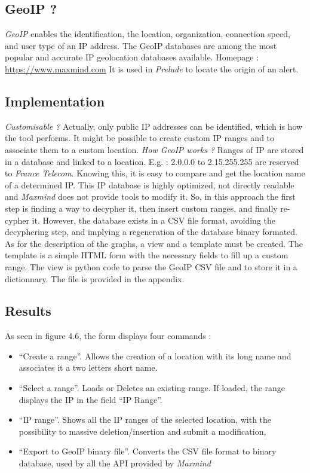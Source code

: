 \documentclass{koala-en}
\begin{document}
\subsection{GeoIP ?}
\emph{GeoIP} enables the identification, the location, organization, connection speed, and user type of an IP address. The GeoIP databases are among the most popular and accurate IP geolocation databases available.
\newline
\newline
Homepage : \url{https://www.maxmind.com}
\newline
\newline
It is used in \emph{Prelude} to locate the origin of an alert.

\subsection{Implementation}
\emph{Customisable ?}
Actually, only public IP addresses can be identified, which is how the tool performs. It might be possible to create custom IP ranges and to associate them to a custom location.
\newline
\newline
\emph{How GeoIP works ?} Ranges of IP are stored in a database and linked to a location. E.g. : 2.0.0.0 to 2.15.255.255 are reserved to \emph{France Telecom}. Knowing this, it is easy to compare and get the location name of a determined IP. This IP database is highly optimized, not directly readable and \emph{Maxmind} does not provide tools to modify it. So, in this approach the first step is finding a way to decypher it, then insert custom ranges, and finally re-cypher it. However, the database exists in a CSV file format, avoiding the decyphering step, and implying a regeneration of the database binary formated.
\newline
\newline
As for the description of the graphs, a view and a template must be created. The template is a simple HTML form with the necessary fields to fill up a custom range. The view is python code to parse the GeoIP CSV file and to store it in a dictionnary. The file is provided in the appendix.

\subsection{Results}
As seen in figure 4.6, the form displays four commands :
\begin{itemize}
  \item ``Create a range''. Allows the creation of a location with its long name and associates it a two letters short name.
  \item ``Select a range''. Loads or Deletes an existing range. If loaded, the range displays the IP in the field ``IP Range''.
  \item ``IP range''. Shows all the IP ranges of the selected location, with the possibility to massive deletion/insertion and submit a modification,
  \item ``Export to GeoIP binary file''. Converts the CSV file format to binary database, used by all the API provided by \emph{Maxmind}
\end{itemize}
\end{document}

